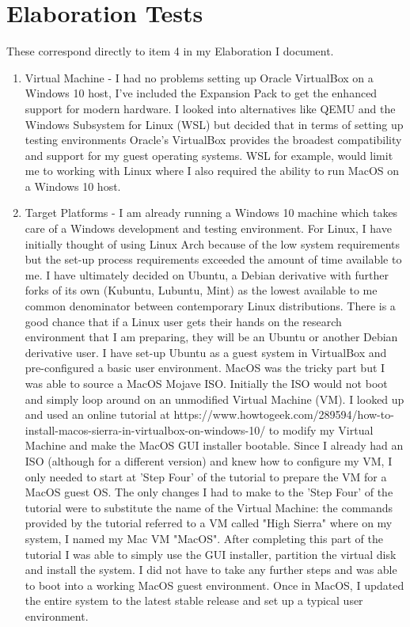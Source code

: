 \documentclass{article}
\begin{document}
\section{Elaboration Tests}
These correspond directly to item 4 in my Elaboration I document.
\begin{enumerate}
    \item Virtual Machine - I had no problems setting up Oracle VirtualBox on a Windows 10 host, I've included the Expansion Pack to get the enhanced support for modern hardware. I looked into alternatives like QEMU and the Windows Subsystem for Linux (WSL) but decided that in terms of setting up testing environments Oracle's VirtualBox provides the broadest compatibility and support for my guest operating systems. WSL for example, would limit me to working with Linux where I also required the ability to run MacOS on a Windows 10 host.
    \item Target Platforms - I am already running a Windows 10 machine which takes care of a Windows development and testing environment. \newline For Linux, I have initially thought of using Linux Arch because of the low system requirements but the set-up process requirements exceeded the amount of time available to me. I have ultimately decided on Ubuntu, a Debian derivative with further forks of its own (Kubuntu, Lubuntu, Mint) as the lowest available to me common denominator between contemporary Linux distributions. There is a good chance that if a Linux user gets their hands on the research environment that I am preparing, they will be an Ubuntu or another Debian derivative user. I have set-up Ubuntu as a guest system in VirtualBox and pre-configured a basic user environment. \newline MacOS was the tricky part but I was able to source a MacOS Mojave ISO. Initially the ISO would not boot and simply loop around on an unmodified Virtual Machine (VM). I looked up and used an online tutorial at https://www.howtogeek.com/289594/how-to-install-macos-sierra-in-virtualbox-on-windows-10/ to modify my Virtual Machine and make the MacOS GUI installer bootable. Since I already had an ISO (although for a different version) and knew how to configure my VM, I only needed to start at 'Step Four' of the tutorial to prepare the VM for a MacOS guest OS. The only changes I had to make to the 'Step Four' of the tutorial were to substitute the name of the Virtual Machine: the commands provided by the tutorial referred to a VM called "High Sierra" where on my system, I named my Mac VM "MacOS". After completing this part of the tutorial I was able to simply use the GUI installer, partition the virtual disk and install the system. I did not have to take any further steps and was able to boot into a working MacOS guest environment. Once in MacOS, I updated the entire system to the latest stable release and set up a typical user environment.

\end{enumerate}
\end{document}
